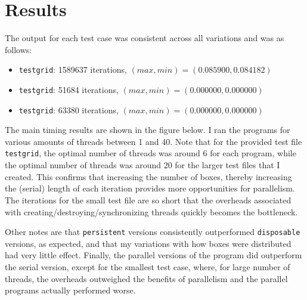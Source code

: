 \documentclass{article}
\begin{document}
\newpage
\section*{Results}
\label{sec:results}

The output for each test case was consistent across all variations and was as follows:
\begin{itemize}
    \item \texttt{testgrid}: 1589637 iterations, $(max, min) = (0.085900, 0.084182)$
    \item \texttt{testgrid}: 51684 iterations, $(max, min) = (0.000000, 0.000000)$
    \item \texttt{testgrid}: 63380 iterations, $(max, min) = (0.000000, 0.000000)$
\end{itemize}

The main timing results are shown in the figure below. I ran the programs for
various amounts of threads between 1 and 40. Note that for the provided test
file \texttt{testgrid}, the optimal
number of threads was around 6 for each program, while the optimal number of
threads was around 20 for the larger test files that I created. This confirms
that increasing the number of boxes, thereby increasing the (serial) length of
each iteration provides more opportunities for parallelism. The iterations for
the small test file are so short that the overheads associated with
creating/destroying/synchronizing threads quickly becomes the bottleneck.

Other notes are that \texttt{persistent} versions consistently outperformed
\texttt{disposable} versions, as expected, and that my variations with how
boxes were distributed had very little effect. Finally, the parallel versions
of the program did outperform the serial version, except for the smallest test
case, where, for large number of threads, the overheads outweighed the benefits
of parallelism and the parallel programs actually performed worse.
\end{document}
